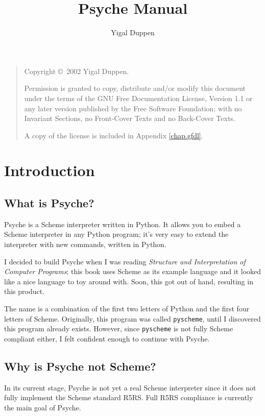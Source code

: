 \documentclass{report}
\title{Psyche Manual}
\author{Yigal Duppen}
\newcommand{\file}[1]{\texttt{#1}}
\begin{document}
\maketitle


%
%
\begin{quote}
Copyright \copyright\ 2002  Yigal Duppen.

Permission is granted to copy, distribute and/or modify this document
under the terms of the GNU Free Documentation License, Version 1.1
or any later version published by the Free Software Foundation;
with no Invariant Sections, no Front-Cover Texts and no Back-Cover Texts. 

A copy of the license is included in Appendix \ref{chap.gfdl}.
\end{quote}

\begin{latexonly}
\tableofcontents
\end{latexonly}


%
%
\chapter{Introduction}
\label{chap:introduction}

\section{What is Psyche?}
Psyche is a Scheme interpreter written in Python. It allows you to
embed a Scheme interpreter in any Python program; it's very easy to
extend the interpreter with new commands, written in Python.

I decided to build Psyche when I was reading \emph{Structure and
Interpretation of Computer Programs}\cite{sicp}; this book uses Scheme
as its example language and it looked like a nice language to toy
around with. Soon, this got out of hand, resulting in this product.

The name is a combination of the first two letters of Python and the
first four letters of Scheme. Originally, this program was called
\file{pyscheme}, until I discovered this program already
exists\cite{pyscheme}. However, since \file{pyscheme} is not fully
Scheme compliant either, I felt confident enough to continue with
Psyche.


\section{Why is Psyche not Scheme?}
In its current stage, Psyche is not yet a real Scheme interpreter
since it does not fully implement the Scheme standard
R5RS\cite{r5rs}. Full R5RS compliance is currently the main goal of
Psyche.
\end{document}
